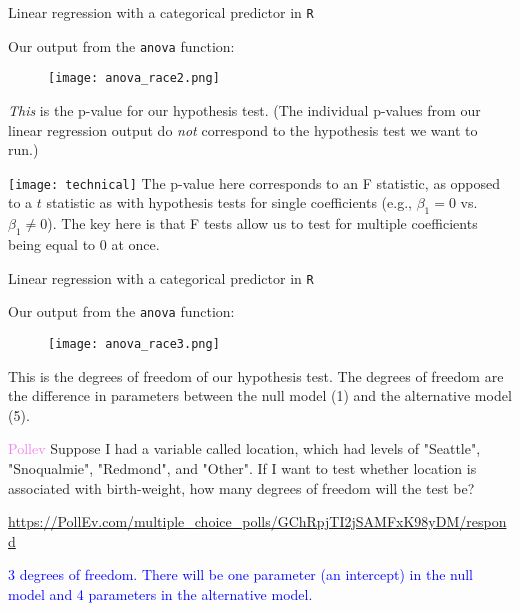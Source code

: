 \documentclass[10pt,t]{beamer}
\begin{document}
\begin{frame}{Linear regression with a categorical predictor in \texttt{R}}
	\vspace{-5mm}
	
Our output from the \texttt{anova} function:

\vspace{0.15cm}

\begin{figure}
	\centering \texttt{[image: anova\_race2.png]}
\end{figure}

\vspace{0.15cm}

\textit{This} is the p-value for our hypothesis test. (The individual p-values from our linear regression output do \textit{not} correspond to the hypothesis test we want to run.) \pause

\vspace{0.3cm}


\texttt{[image: technical]} The p-value here corresponds to an F statistic, as opposed to a $t$ statistic as with hypothesis tests for single coefficients (e.g., $\beta_1 = 0$ vs. $\beta_1 \neq 0$). The key here is that F tests allow us to test for multiple coefficients being equal to $0$ at once.

\end{frame}

\begin{frame}{Linear regression with a categorical predictor in \texttt{R}}
	\vspace{-5mm}
	
	Our output from the \texttt{anova} function:
	
	\vspace{0.15cm}
	
	\begin{figure}
		\centering \texttt{[image: anova\_race3.png]}
	\end{figure}
	
	\vspace{0.15cm}
	
This is the degrees of freedom of our hypothesis test. The degrees of freedom are the difference in parameters between the null model (1) and the alternative model (5).
	

	
\end{frame}

\begin{frame}{\textcolor{violet}{Pollev}}
	Suppose I had a variable called location, which had levels of "Seattle", "Snoqualmie", "Redmond", and "Other". If I want to test whether location is associated with birth-weight, how many degrees of freedom will the test be? 
	
	\bigskip
	
		\url{https://PollEv.com/multiple_choice_polls/GChRpjTI2jSAMFxK98yDM/respond}\pause
	
	\bigskip
	
	\textcolor{blue}{3 degrees of freedom. There will be one parameter (an intercept) in the null model and 4 parameters in the alternative model.}
	
\end{frame}
\end{document}
